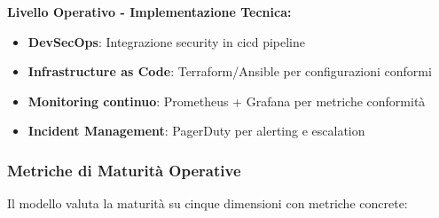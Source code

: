 \textbf{Livello Operativo - Implementazione Tecnica:}
\begin{itemize}
    \item \textbf{DevSecOps}: Integrazione security in \gls{cicd} pipeline
    \item \textbf{Infrastructure as Code}: Terraform/Ansible per configurazioni conformi
    \item \textbf{Monitoring continuo}: Prometheus + Grafana per metriche conformità
    \item \textbf{Incident Management}: PagerDuty per alerting e escalation
\end{itemize}

\subsubsection{Metriche di Maturità Operative}

Il modello valuta la maturità su cinque dimensioni con metriche concrete:

